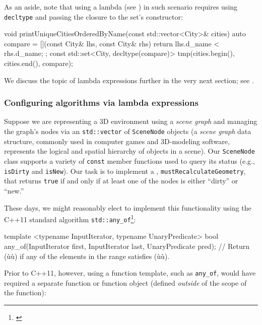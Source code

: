 As an aside, note that using a lambda (see ) in such scenario requires using \lstinline!decltype! and passing the closure to the set's constructor:
\begin{emcppslisting}[emcppsbatch=e3]
void printUniqueCitiesOrderedByName(const std::vector<City>& cities)
{
    auto compare = [](const City& lhs, const City& rhs) {
        return lhs.d_name < rhs.d_name;
    };
    const std::set<City, decltype(compare)>
        tmp(cities.begin(), cities.end(), compare);
}
\end{emcppslisting}

\noindent We discuss the topic of lambda expressions further in the very next section; see .

\subsubsection[Configuring algorithms via lambda expressions]{Configuring algorithms via lambda expressions}\label{configuring-algorithms-via-lambda-expressions}

Suppose we are representing a 3D environment using a \emph{scene
graph} and managing
the graph's nodes via an \lstinline!std::vector! of \lstinline!SceneNode!
objects (a \emph{scene graph} data structure, commonly
used in computer games and 3D-modeling software, represents the
  logical and spatial hierarchy of objects in a scene). Our \lstinline!SceneNode! class supports a variety of
\lstinline!const! member functions used to query its status (e.g.,
\lstinline!isDirty! and \lstinline!isNew!). Our task is to implement a
, \lstinline!mustRecalculateGeometry!, that
returns \lstinline!true! if and only if at least one of the nodes is either
``dirty'' or ``new.''

These days, we might reasonably elect to implement this functionality
using the C++11 standard algorithm
\lstinline!std::any_of!{\cprotect\footnote{\cite{cpprefa}}}:

\begin{emcppslisting}[emcppsbatch=e4]
template <typename InputIterator, typename UnaryPredicate>
bool any_of(InputIterator first, InputIterator last, UnaryPredicate pred);
    // Return (ù{}ù) if any of the elements in the range satisfies (ù{}ù).
\end{emcppslisting}

\noindent Prior to C++11, however, using a function template, such as
\lstinline!any_of!, would have required a separate function or
function object (defined \emph{outside} of the scope of the function):

